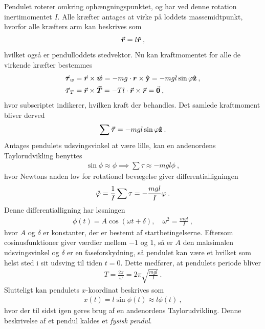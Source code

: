 \noindent
Pendulet roterer omkring ophængningspunktet, og har ved denne rotation inertimomentet $I$. Alle kræfter antages at virke på loddets massemidtpunkt, hvorfor alle kræfters arm kan beskrives som
%
\begin{align}
	{\vec{\boldsymbol{r}}} = l\boldsymbol{\hat{r}} \: ,
\end{align}
%
hvilket også er pendulloddets stedvektor. Nu kan kraftmomentet for alle de virkende kræfter bestemmes
%
\begin{equation}
\begin{aligned}
	{\vec{\boldsymbol{\tau}}}_w &= {\vec{\boldsymbol{r}}} \times {\vec{\boldsymbol{w}}} = -mg \cdot \boldsymbol{r} \times \mathbf{\hat{y}} = -mgl\sin\varphi\mathbf{\hat{z}} \: , \\
	{\vec{\boldsymbol{\tau}}}_T &= {\vec{\boldsymbol{r}}} \times {\vec{\boldsymbol{T}}} = -Tl \cdot {\vec{\boldsymbol{r}}} \times {\vec{\boldsymbol{r}}} = {\vec{\boldsymbol{0}}} \: ,
\end{aligned}
\end{equation}
%
hvor subscriptet indikerer, hvilken kraft der behandles. Det samlede kraftmoment bliver derved
%
\begin{align}
	\sum{\vec{\boldsymbol{\tau}}} = - mgl\sin\varphi \mathbf{\hat{z}} \: .
\end{align}
%
Antages pendulets udsvingsvinkel at være lille, kan en andenordens Taylorudvikling benyttes
%
\begin{align}
	\sin\phi\approx\phi \implies \sum\tau \approx -mgl\phi \: ,
\end{align}
%
hvor Newtons anden lov for rotationel bevægelse giver differentialligningen
%
\begin{align}
	\ddot{\varphi} = \frac{1}{I}\sum\tau = -\frac{mgl}{I}\varphi \: .
\end{align}
%
Denne differentialligning har løsningen
%
\begin{align} \label{eq:PendulFuld}
	\phi(t) = A\cos\left(\omega t + \delta\right), \quad \omega^2 = \frac{mgl}{I} \: ,
\end{align}
%
hvor $A$ og $\delta$ er konstanter, der er bestemt af startbetingelserne. Eftersom cosinusfunktioner giver værdier mellem $-1$ og $1$, så er $A$ den maksimalen udsvingsvinkel og $\delta$ er en faseforskydning, så pendulet kan være et hvilket som helst sted i sit udsving til tiden $t=0$.
Dette medfører, at pendulets periode bliver
%
\begin{align}
	T = \frac{2\pi}{\omega} = 2\pi\sqrt{\frac{mgl}{I}} \: .
\end{align}
%
Slutteligt kan pendulets $x$-koordinat beskrives som
%
\begin{align}
	x(t) = l\sin\phi(t) \approx l\phi(t) \: ,
\end{align}
%
hvor der til sidst igen gøres brug af en andenordens Taylorudvikling. Denne beskrivelse af et pendul kaldes et \textit{fysisk pendul}.


